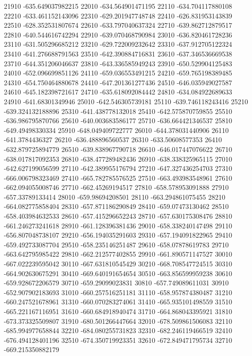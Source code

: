 {21910 -635.649037982215
22010 -634.564901471195
22110 -634.704117880108
22210 -633.461152143096
22310 -629.201947748748
22410 -626.831953143839
22510 -628.352531807674
22610 -633.797040637324
22710 -639.862712879517
22810 -640.544616742294
22910 -639.070468790984
23010 -636.820461728236
23110 -631.505296685212
23210 -629.722009232642
23310 -637.912705122324
23410 -641.276688791563
23510 -642.390884716831
23610 -637.346536669538
23710 -644.351206046637
23810 -643.336585949243
23910 -650.529904125483
24010 -652.096699851126
24110 -659.036553491215
24210 -659.765198389485
24310 -654.750464880678
24410 -647.201361277436
24510 -646.035949027587
24610 -645.182398721617
24710 -635.618092084442
24810 -634.084922689633
24910 -641.68301349946
25010 -642.546305739181
25110 -639.746118243416
25210 -639.324132188896
25310 -641.438778132018
25410 -642.575870759855
25510 -636.986795870766
25610 -640.003683586177
25710 -636.664421346537
25810 -649.49498330334
25910 -648.049409722777
26010 -644.378031440906
26110 -641.3784436327
26210 -636.488896560537
26310 -633.50608577353
26410 -632.879725894779
26510 -639.838967790718
26610 -646.017447076622
26710 -638.017817092353
26810 -638.477289482436
26910 -638.338325965115
27010 -642.627199056599
27110 -642.389955176794
27210 -647.327436254703
27310 -666.006798323469
27410 -665.782785576525
27510 -663.493983548961
27610 -662.094055008746
27710 -662.45269194517
27810 -658.578953091888
27910 -657.33789133414
28010 -659.98694208501
28110 -663.294861075455
28210 -664.082775858404
28310 -657.871186290849
28410 -659.07473130462
28510 -658.403984632533
28610 -657.415296652243
28710 -657.630175308476
28810 -661.246273241618
28910 -661.128396381436
29010 -658.338240147498
29110 -656.807048738107
29210 -656.194035291603
29310 -657.194091822965
29410 -659.492733087704
29510 -658.235146251487
29610 -658.07878619783
29710 -663.642795985422
29810 -662.212577402855
29910 -661.890571147527
30010 -667.022239595042
30110 -667.631810545429
30210 -668.708547724515
30310 -664.902630675291
30410 -669.640191654654
30510 -663.856599959238
30610 -659.928672206579
30710 -659.29099023831
30810 -657.749089611031
30910 -652.907902183693
31010 -660.257516251181
31110 -658.957874380487
31210 -660.247521678961
31310 -660.070283274061
31410 -665.935101498559
31510 -665.221167116951
31610 -660.684918940474
31710 -664.868043395921
31810 -673.373325509807
31910 -680.501266447664
32010 -678.509861506083
32110 -685.994977658844
32210 -684.080255731823
32310 -682.246119466519
32410 -676.494128401196
32510 -674.350719923351
32610 -672.849471795734
32710 -669.215350882179
}
